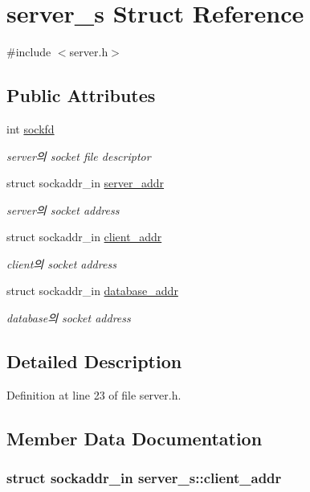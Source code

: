 \hypertarget{structserver__s}{\section{server\-\_\-s Struct Reference}
\label{structserver__s}
}


{\ttfamily \#include $<$server.\-h$>$}

\subsection*{Public Attributes}
\begin{DoxyCompactItemize}
\item 
int \hyperlink{structserver__s_a7109ed4db0376f7de840d82c4379099d}{sockfd}
\begin{DoxyCompactList}\small\item\em server의 socket file descriptor \end{DoxyCompactList}\item 
struct sockaddr\-\_\-in \hyperlink{structserver__s_aa49ed3594b99b1da4de179995dfa553d}{server\-\_\-addr}
\begin{DoxyCompactList}\small\item\em server의 socket address \end{DoxyCompactList}\item 
struct sockaddr\-\_\-in \hyperlink{structserver__s_a542d49f8aee930024091c320530d8dbf}{client\-\_\-addr}
\begin{DoxyCompactList}\small\item\em client의 socket address \end{DoxyCompactList}\item 
struct sockaddr\-\_\-in \hyperlink{structserver__s_aa4bdd0e294e21fe34f1c9b6e30ee4904}{database\-\_\-addr}
\begin{DoxyCompactList}\small\item\em database의 socket address \end{DoxyCompactList}\end{DoxyCompactItemize}


\subsection{Detailed Description}


Definition at line 23 of file server.\-h.



\subsection{Member Data Documentation}
\hypertarget{structserver__s_a542d49f8aee930024091c320530d8dbf}{
\subsubsection[{client\-\_\-addr}]{\setlength{\rightskip}{0pt plus 5cm}struct sockaddr\-\_\-in server\-\_\-s\-::client\-\_\-addr}}\label{structserver__s_a542d49f8aee930024091c320530d8dbf}


